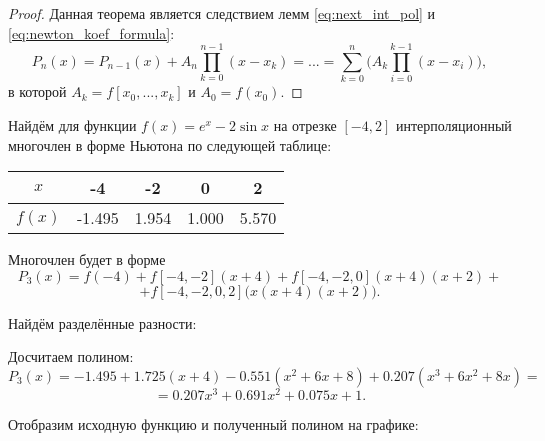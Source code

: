 \documentclass[../main.tex]{subfile}
\begin{document}
\begin{proof}
	Данная теорема является следствием лемм \eqref{eq:next_int_pol} и
	\eqref{eq:newton_koef_formula}:
	\[P_n(x)=P_{n-1}(x)+A_n\prod_{k=0}^{n-1}(x-x_k)=...=
	\sum_{k=0}^{n}\big(A_k\prod_{i=0}^{k-1}(x-x_i)\big),\]
	в которой $A_k=f[x_0,...,x_k]$ и $A_0=f(x_0)$.
\end{proof}

\begin{example}\label{eq:newton_polynomial_example}
	Найдём для функции $f(x)=e^x-2\sin x$ на отрезке $[-4,2]$
	интерполяционный многочлен в форме Ньютона по следующей таблице:\\

	\begin{tabular}{*{5}{|c}|}
		\hline
		$x$	& -4	& -2	& 0	& 2	\\
		\hline
		$f(x)$	&-1.495	& 1.954	& 1.000	& 5.570	\\
		\hline
	\end{tabular}\leavevmode\newline

	Многочлен будет в форме
	\[P_3(x)=f(-4)+f[-4,-2](x+4)+f[-4,-2,0](x+4)(x+2)+\]
	\[+f[-4,-2,0,2]\big(x(x+4)(x+2)\big).\]

	Найдём разделённые разности:

	\begin{table}[h]
		\centering
	\end{table}
	Досчитаем полином:
	\[P_3(x)=-1.495+1.725(x+4)-0.551(x^2+6x+8)+0.207(x^3+6x^2+8x)=\]
	\[=0.207x^3+0.691x^2+0.075x+1.\]
	\newpage

	Отобразим исходную функцию и полученный полином на графике:

	

\end{example}
\end{document}
